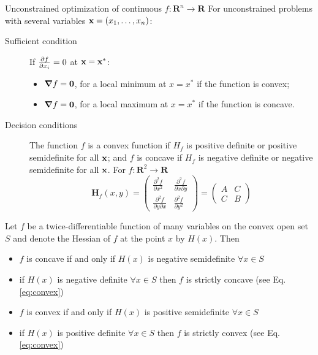 \documentclass[c]{beamer}
\begin{document}
\begin{frame}[allowframebreaks]{Unconstrained optimization of continuous $f:\mathbf{R}^n\rightarrow\mathbf{R}$}
  For unconstrained problems with several variables $\textbf{x}=(x_1,\ldots,x_n)$:
  \begin{description}
    \item[Sufficient condition] If $\pdv{f}{x_i}=0$ at $\textbf{x}=\textbf{x}^*$:
    \begin{itemize}
      \item $\grad{f}=\textbf{0}$, for a local minimum at $x=x^*$ if the function is convex;
      \item $\grad{f}=\textbf{0}$, for a local maximum at $x=x^*$ if the function is concave.
    \end{itemize}
    \item[Decision conditions] The function $f$ is a convex function if $H_f$ is positive definite or positive semidefinite for all $\textbf{x}$; and $f$ is concave if $H_f$ is negative definite or negative semidefinite for all $\textbf{x}$. For $f:\mathbf{R}^2\rightarrow\mathbf{R}$
    \[
      {\mathbf H}_f(x,y)=\begin{pmatrix} \frac{\partial^2 f}{\partial x^2} & \frac{\partial^2 f}{\partial x \partial y} \\ \frac{\partial^2 f}{\partial y \partial x} & \frac{\partial^2 f}{\partial y^2}\end{pmatrix} =
      \begin{pmatrix} A & C \\ C & B \end{pmatrix}
\]
  \end{description}

  Let $f$ be a twice-differentiable function of many variables on the convex open set $S$ and denote the Hessian of $f$ at the point $x$ by $H(x)$. Then
\begin{itemize}
  \item $f$ is concave if and only if $H(x)$ is negative semidefinite $\forall x \in S$
  \item if $H(x)$ is negative definite $\forall x \in S$ then $f$ is strictly concave (see Eq. \ref{eq:convex})
  \item $f$ is convex if and only if $H(x)$ is positive semidefinite $\forall x \in S$
  \item if $H(x)$ is positive definite $\forall x \in S$ then $f$ is strictly convex (see Eq. \ref{eq:convex})
\end{itemize}

\end{frame}
\end{document}
